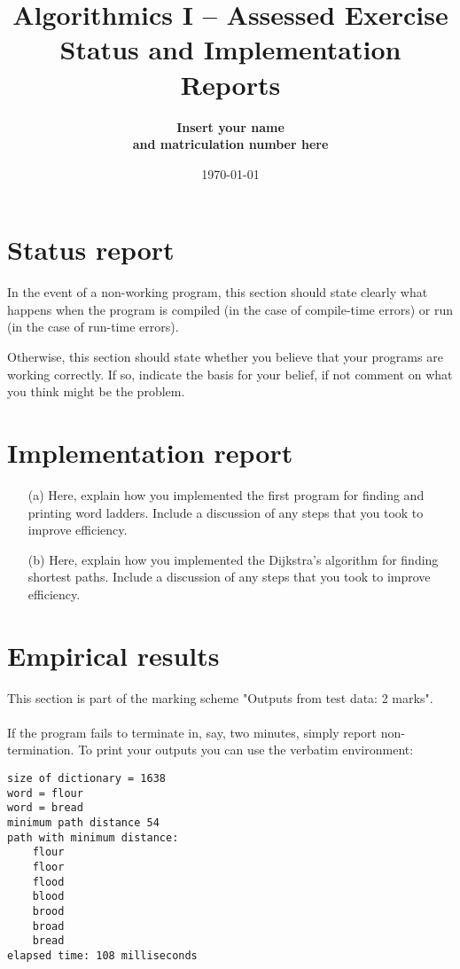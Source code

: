 \usepackage{layout}
 
\geometry{includeheadfoot,margin=2cm}
\title{Algorithmics I --  Assessed Exercise\\ \vspace{4mm} 
Status and Implementation Reports}

\author{\bf Insert your name\\ \bf and matriculation number here}

\date{\today}


\maketitle

\section*{Status report}

In the event of a non-working program, this section should state clearly what happens when the program is compiled (in the case of compile-time errors) or run (in the case of run-time errors).  

Otherwise, this section should state whether you believe that your programs are working correctly. If so, indicate the basis for your belief, if not comment on what you think might be the problem.

\section*{Implementation report}

\begin{itemize}
\item[(a)] 
Here, explain how you implemented the first program for finding and printing word ladders. Include a discussion of any steps that you took to improve efficiency.
\item[(b)]
Here, explain how you implemented the Dijkstra's algorithm for finding shortest paths. Include a discussion of any steps that you took to improve efficiency.
\end{itemize}

\section*{Empirical results}

This section is part of the marking scheme "Outputs from test data: 2 marks".
\\ \\
If the program fails to terminate in, say, two minutes, simply report non-termination. To print your outputs you can use the verbatim environment:

\begin{verbatim}
size of dictionary = 1638
word = flour
word = bread
minimum path distance 54
path with minimum distance:
    flour
    floor
    flood
    blood
    brood
    broad
    bread
elapsed time: 108 milliseconds
\end{verbatim}



